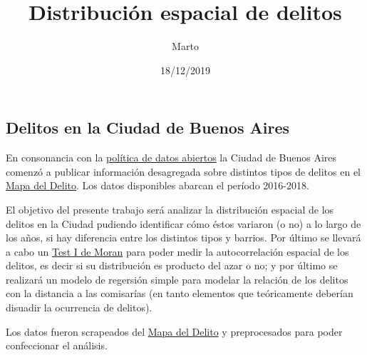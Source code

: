 \documentclass[]{article}
\title{Distribución espacial de delitos}
\author{Marto}
\date{18/12/2019}
\begin{document}
\maketitle

\hypertarget{delitos-en-la-ciudad-de-buenos-aires}{%
\subsection{Delitos en la Ciudad de Buenos
Aires}\label{delitos-en-la-ciudad-de-buenos-aires}}

En consonancia con la
\href{http://rpubs.com/martinalalu/centralidades-comerciales}{política
de datos abiertos} la Ciudad de Buenos Aires comenzó a publicar
información desagregada sobre distintos tipos de delitos en el
\href{https://mapa.seguridadciudad.gob.ar/}{Mapa del Delito}. Los datos
disponibles abarcan el período 2016-2018.

El objetivo del presente trabajo será analizar la distribución espacial
de los delitos en la Ciudad pudiendo identificar cómo éstos variaron (o
no) a lo largo de los años, si hay diferencia entre los distintos tipos
y barrios. Por último se llevará a cabo un
\href{https://es.wikipedia.org/wiki/I_de_Moran}{Test I de Moran} para
poder medir la autocorrelación espacial de los delitos, es decir si su
distribución es producto del azar o no; y por último se realizará un
modelo de regersión simple para modelar la relación de los delitos con
la distancia a las comisarías (en tanto elementos que teóricamente
deberían disuadir la ocurrencia de delitos).

Los datos fueron scrapeados del
\href{https://mapa.seguridadciudad.gob.ar/}{Mapa del Delito} y
preprocesados para poder confeccionar el análisis.
\end{document}
